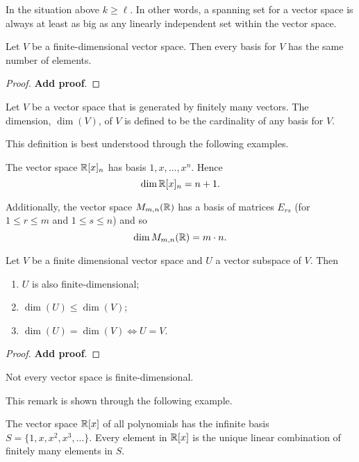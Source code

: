 \documentclass[10pt, a4paper]{article}
\begin{document}
\begin{corollary}
    In the situation above $k \geq \ell$.
    In other words,
    a spanning set for a vector space is always at least as big as any linearly independent set within the vector space.
\end{corollary}

\begin{corollary}
    Let $V$ be a finite-dimensional vector space.
    Then every basis for $V$ has the same number of elements.
    \begin{proof}
        \textbf{Add proof}.
    \end{proof}
\end{corollary}

\begin{definition}[Dimension]
    Let $V$ be a vector space that is generated by finitely many vectors.
    The dimension,
    $\dim{(V)}$,
    of $V$ is defined to be the cardinality of any basis for $V$.
\end{definition}
This definition is best understood through the following examples.
\begin{example}
    The vector space $\mathbb{R}[x]_n$ has basis $1, x, \dotsc, x ^ n$.
    Hence
    \[
    \dim{\mathbb{R}[x]_n} = n + 1.
    \]

    Additionally,
    the vector space $M_{m, n}(\mathbb{R})$ has a basis of matrices $E_{rs}$
    (for $1 \leq r \leq m$ and $1 \leq s \leq n$)
    and so
    \[
    \dim{M_{m, n}(\mathbb{R})} = m \cdot n.
    \]
\end{example}

\begin{theorem}\label{pre:linalg:thm:finitedimensionalvecspacegivesdimresults}
    Let $V$ be a finite dimensional vector space and $U$ a vector subspace of $V$.
    Then
    \begin{enumerate}[label = (\roman*)]
        \item $U$ is also finite-dimensional;
        \item $\dim{(U)} \leq \dim{(V)}$;
        \item $\dim{(U)} = \dim{(V)} \iff U = V$.
    \end{enumerate}
    \begin{proof}
        \textbf{Add proof}.
    \end{proof}
\end{theorem}

\begin{remark}
    Not every vector space is finite-dimensional.
\end{remark}
This remark is shown through the following example.
\begin{example}
    The vector space $\mathbb{R}[x]$ of all polynomials has the infinite basis $S = \{1, x, x ^ 2, x ^ 3, \dotsc\}$.
    Every element in $\mathbb{R}[x]$ is the unique linear combination of finitely many elements in $S$.
\end{example}
\end{document}
